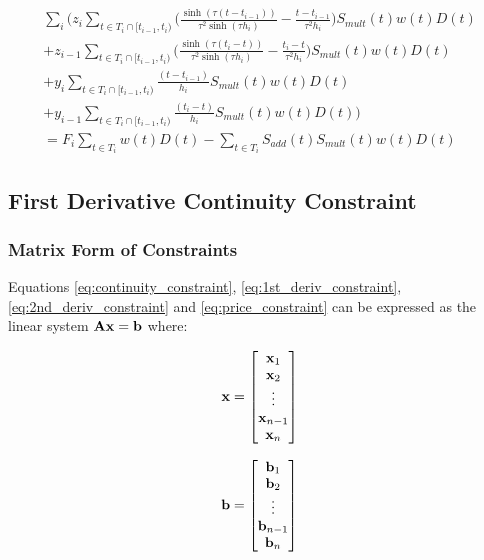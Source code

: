 \documentclass{article}
\begin{document}
\begin{multline}
    \sum_i \biggl(  z_i \sum_{t \in T_i \cap [t_{i-1}, t_i)} \biggl( \frac{\sinh(\tau (t - t_{i-1}))}{\tau^2 \sinh(\tau h_i)} 
      - \frac{t - t_{i-1}}{\tau^2 h_i} \biggr) S_{mult}(t)w(t)D(t) \\
    + z_{i-1} \sum_{t \in T_i \cap [t_{i-1}, t_i)} \biggl( \frac{\sinh(\tau (t_i - t))}{\tau^2 \sinh(\tau h_i)} 
     - \frac{t_i - t}{\tau^2 h_i} \biggr) S_{mult}(t)w(t)D(t) \\
    + y_i \sum_{t \in T_i \cap [t_{i-1}, t_i)} \frac{(t - t_{i-1})}{h_i} S_{mult}(t)w(t)D(t) \\
    + y_{i-1} \sum_{t \in T_i \cap [t_{i-1}, t_i)} \frac{(t_i - t)}{h_i} S_{mult}(t)w(t)D(t) \biggr) \\
    = F_i \sum_{t \in T_i} w(t)D(t) - \sum_{t \in T_i} S_{add}(t) S_{mult}(t)w(t)D(t)
\end{multline}


\subsection{First Derivative Continuity Constraint}


\subsubsection{Matrix Form of Constraints}
Equations \ref{eq:continuity_constraint}, \ref{eq:1st_deriv_constraint}, \ref{eq:2nd_deriv_constraint} and
 \ref{eq:price_constraint} can be expressed as the linear system $\mathbf{Ax = b}$ where:

\begin{equation*}
    \mathbf{x} = \begin{bmatrix}
        \mathbf{x}_1 \\
        \mathbf{x}_2 \\
        \vdots \\
        \mathbf{x}_{n-1} \\
        \mathbf{x}_n \\
    \end{bmatrix}
\end{equation*}

\begin{equation*}
    \mathbf{b} = \begin{bmatrix}
        \mathbf{b}_1 \\
        \mathbf{b}_2 \\
        \vdots \\
        \mathbf{b}_{n-1} \\
        \mathbf{b}_n \\
    \end{bmatrix}
\end{equation*}
\end{document}
